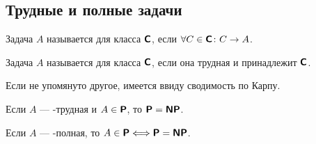 \subsection{Трудные и полные задачи}
\begin{defn}
	Задача $ A$ называется  для класса $\Class$, если  $ \forall C \in \Class \colon C \to A$.

	\noindent
	Задача $ A$ называется  для класса $ \Class$, если она трудная и принадлежит $ \Class$.
\end{defn}
\begin{note}
    Если не упомянуто другое, имеется ввиду сводимость по Карпу.
\end{note}

\begin{thm}
    Если $ A$ --- \NP-трудная и $ A \in \P$, то $ \P = \NP$.
\end{thm}

\begin{cor}
    Если $ A$ --- \NP-полная, то $
    A \in \P \Longleftrightarrow \P = \NP
    $. 
\end{cor}


